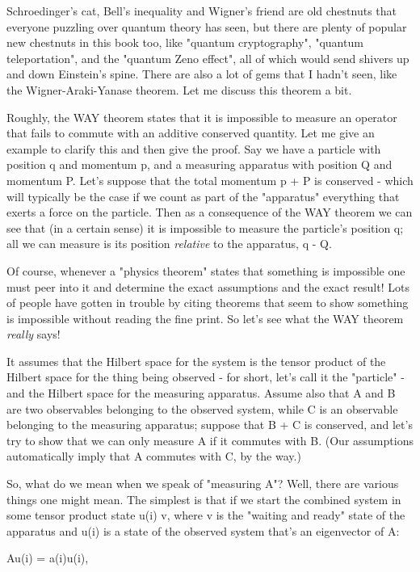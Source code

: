 Schroedinger's cat, Bell's inequality and Wigner's friend are old
chestnuts that everyone puzzling over quantum theory has seen, but 
there are plenty of popular new chestnuts in this book too, like "quantum
cryptography", "quantum teleportation", and the "quantum Zeno effect", 
all of which would send shivers up and down Einstein's spine.
There are also a lot of gems that I hadn't seen, like the 
Wigner-Araki-Yanase theorem.  Let me discuss this theorem a bit.

Roughly, the WAY theorem states that it is impossible to measure an
operator that fails to commute with an additive conserved quantity.  Let
me give an example to clarify this and then give the proof.  Say we have
a particle with position q and momentum p, and a measuring apparatus
with position Q and momentum P.  Let's suppose that the total momentum p
+ P is conserved - which will typically be the case if we count as
part of the "apparatus" everything that exerts a force on the particle.
Then as a consequence of the WAY theorem we can see that (in a certain
sense) it is impossible to measure the particle's position q; all we can
measure is its position \emph{relative} to the apparatus, q - Q.

Of course, whenever a "physics theorem" states that something is
impossible one must peer into it and determine the exact assumptions and
the exact result!  Lots of people have gotten in trouble by citing
theorems that seem to show something is impossible without reading the fine
print.  So let's see what the WAY theorem \emph{really} says!

It assumes that the Hilbert space for the system is the tensor product
of the Hilbert space for the thing being observed - for short, let's
call it the "particle" - and the Hilbert space for the measuring
apparatus.  Assume also that A and B are two observables belonging to
the observed system, while C is an observable belonging to the measuring
apparatus; suppose that B + C is conserved, and let's try to show that
we can only measure A if it commutes with B.  (Our assumptions
automatically imply that A commutes with C, by the way.)

So, what do we mean when we speak of "measuring A"?  Well, there are
various things one might mean.  The simplest is that if we start the
combined system in some tensor product state u(i) \otimes  v, where v is the 
"waiting and ready" state of the apparatus and u(i) is a state
of the observed system that's an eigenvector of A:

Au(i) = a(i)u(i), 

